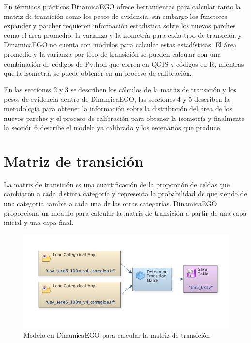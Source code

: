 \documentclass[12pt,a4paper,oldfontcommands]{article}
\begin{document}
En términos prácticos DinamicaEGO ofrece herramientas para calcular tanto la matriz de transición como los pesos de evidencia, sin embargo los functores expander y patcher requieren información estadística sobre los nuevos parches como el área promedio, la varianza y la isometría para cada tipo de transición y DinamicaEGO no cuenta con módulos para calcular estas estadísticas. El área promedio y la varianza por tipo de transición se pueden calcular con una combinación de códigos de Python que corren en QGIS y códigos en R, mientras que la isometría se puede obtener en un proceso de calibración.

En las secciones 2 y 3 se describen los cálculos de la matriz de transición y los pesos de evidencia dentro de DinamicaEGO, las secciones 4 y 5 describen la metodología para obtener la información sobre la distribución del área de los nuevos parches y el proceso de calibración para obtener la isometría y finalmente la sección 6 describe el modelo ya calibrado y los escenarios que produce.





\section{Matriz de transición}
La matriz de transición es una cuantificación de la proporción de celdas que cambiaron a cada distinta categoría y representa la probabilidad de que siendo de una categoría cambie a cada una de las otras categorías. DinamicaEGO proporciona un módulo para calcular la matriz de transición a partir de una capa inicial y una capa final.

\begin{figure}[h]
	\centering
	\includegraphics[width=1\textwidth]{./figuras/modelo_matriz.png}
	\caption{Modelo en DinamicaEGO para calcular la matriz de transición}
\end{figure}
\label{fig:modelo_matriz}
\bigskip
\end{document}
